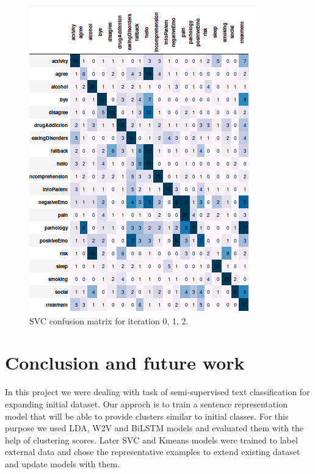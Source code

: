 \documentclass[11pt]{article}
\begin{document}
\begin{figure}[h]
	\includegraphics[scale=0.25]{svc2_cm.png}
	\caption{SVC confusion matrix for iteration 0, 1, 2.}
\label{rbf_svc_cm}
\end{figure}
\FloatBarrier


\section{Conclusion and future work}
\label{sec:conclusion}

In this project we were dealing with task of semi-supervised text classification for expanding initial dataset. Our approch is to train a sentence representation model that will be able to provide clusters similar to initial classes. For this purpose we used LDA, W2V and BiLSTM models and  evaluated them with the help of clustering scores. Later SVC and Kmeans models were trained to label external data and chose the representative examples to extend existing dataset and update models with them.

\end{document}
